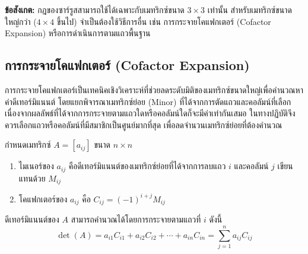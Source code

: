 \begin{rem}
\textbf{ข้อสังเกต:} กฎของซาร์รูสสามารถใช้ได้เฉพาะกับเมทริกซ์ขนาด $3 \times 3$ เท่านั้น สำหรับเมทริกซ์ขนาดใหญ่กว่า ($4 \times 4$ ขึ้นไป) จำเป็นต้องใช้วิธีการอื่น เช่น การกระจายโคแฟกเตอร์ (Cofactor Expansion) หรือการดำเนินการตามแถวพื้นฐาน
\end{rem}

\subsection{การกระจายโคแฟกเตอร์ (Cofactor Expansion)}
\label{ssec:cofactor-expansion}
การกระจายโคแฟกเตอร์เป็นเทคนิคเชิงวิเคราะห์ที่ช่วยลดระดับมิติของเมทริกซ์ขนาดใหญ่เพื่อคำนวณหาค่าดีเทอร์มิแนนต์ โดยแยกพิจารณาเมทริกซ์ย่อย (Minor) ที่ได้จากการตัดแถวและคอลัมน์ที่เลือก เนื่องจากผลลัพธ์ที่ได้จากการกระจายตามแถวใดหรือคอลัมน์ใดก็จะมีค่าเท่ากันเสมอ ในทางปฏิบัติจึงควรเลือกแถวหรือคอลัมน์ที่มีสมาชิกเป็นศูนย์มากที่สุด เพื่อลดจำนวนเมทริกซ์ย่อยที่ต้องคำนวณ~\parencite{strang2023linear}

\begin{definition}
กำหนดเมทริกซ์ $A = [a_{ij}]$ ขนาด $n \times n$
\begin{enumerate}
  \item ไมเนอร์ของ $a_{ij}$ คือดีเทอร์มิแนนต์ของเมทริกซ์ย่อยที่ได้จากการลบแถว $i$ และคอลัมน์ $j$ เขียนแทนด้วย $M_{ij}$
  \item โคแฟกเตอร์ของ $a_{ij}$ คือ $C_{ij} = (-1)^{i+j} M_{ij}$
\end{enumerate}
ดีเทอร์มิแนนต์ของ $A$ สามารถคำนวณได้โดยการกระจายตามแถวที่ $i$ ดังนี้
\[
\det(A) = a_{i1}C_{i1} + a_{i2}C_{i2} + \cdots + a_{in}C_{in} = \sum_{j=1}^{n} a_{ij}C_{ij}
\]
\end{definition}

